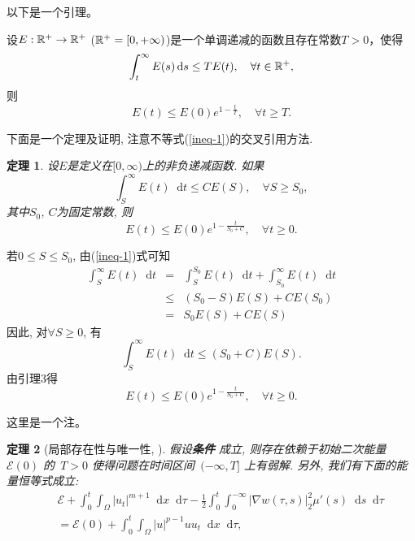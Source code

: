 \documentclass[UTF8,oneside,12pt]{article}
\makeatletter
\theoremstyle{DingLi}
\numberwithin{equation}{section}
\newtheorem{theorem}{\hspace{2em}定理}
\newtheorem{lemma}{\hskip 2em 引理}
\newtheorem{remark}{\hskip 2em 注}
\renewenvironment{proof}[1][\proofname]{\par%
\pushQED{\qed}%
\normalfont \topsep6\p@\@plus6\p@\relax%
\trivlist%
\item[\hskip\labelsep%
#1]\ignorespaces%
}{%
\popQED\endtrivlist\@endpefalse%
}
\renewcommand{\proofname}{\heiti{证明}}%
\def\d{\mathop{}\!\mathrm{d}}
\makeatother
\begin{document}
以下是一个引理。
\begin{lemma}
设$E:\Bbb{R}^+ \to \Bbb{R}^+$ ($\Bbb{R}^+=[0,+\infty)$)是一个单调递减的函数且存在常数$T>0$，使得
$$\int_t^{\infty} E(s) \d s \leq TE(t),\quad \forall t\in \Bbb{R}^+,$$
则
$$E(t)\leq E(0) e^{1- \frac{t}{T}},\quad \forall t\geq T. $$
\end{lemma}

下面是一个定理及证明, 注意不等式(\ref{ineq-1})的交叉引用方法.
\begin{theorem}
设$E$是定义在$[0,\infty)$上的非负递减函数. 如果
\begin{equation}\label{ineq-1}  %
\int_S^{\infty} E(t) \d t \leq CE(S),\quad \forall S\geq S_0,
\end{equation}
其中$S_0$, $C$为固定常数, 则
$$E(t)\leq E(0)e^{1-\frac{t}{S_0+C}},\quad \forall t\geq 0.$$
\end{theorem}

\begin{proof}
若$0\leq S\leq S_0$, 由(\ref{ineq-1})式可知
\begin{eqnarray*}
  \int_S^{\infty} E(t)\d t &=& \int_S^{S_0} E(t)\d t +\int_{S_0}^{\infty} E(t)\d t\\
  &\leq &(S_0-S) E(S)+CE(S_0)\\
 &= &S_0 E(S) +CE(S)
\end{eqnarray*}
因此, 对$\forall S\geq 0$, 有
$$\int_S^{\infty} E(t) \d t \leq  (S_0+C)E(S).$$
由引理3得
$$E(t)\leq E(0)e^{1-\frac{t}{S_0+C}},\quad \forall t\geq 0.$$
\end{proof}
\begin{remark}
这里是一个注。
\end{remark}

\begin{theorem}[局部存在性与唯一性, \cite{Liang-Xu-Auto18}]  \label{Thm: local existence}
 假设\textbf{条件} 成立, 则存在依赖于初始二次能量~$\mathscr{E}(0)$ 的~$T>0$ 使得问题在时间区间~$(-\infty, T]$ 上有弱解. 另外, 我们有下面的能量恒等式成立:
\begin{eqnarray}
&&\mathscr{E}+\int_0^t\int_\Omega |u_t|^{m+1} \d x\d \tau-\frac12 \int_0^t\int_0^{-\infty}|\nabla w(\tau,s)|_2^2 \mu'(s)\d s\d \tau\nonumber\\
&&=\mathscr{E}(0)+\int_0^t\int_\Omega |u|^{p-1}uu_t\d x\d\tau,\label{4 quadratic energy identity}
\end{eqnarray}
\end{theorem}
\end{document}

